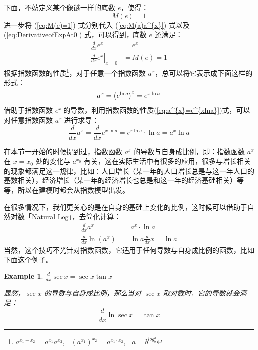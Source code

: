 \documentclass{ctexart}
\numberwithin{equation}{section}
\numberwithin{figure}{section}
\newtheorem{myEx}{Example}[section] %
\begin{document}
下面，不妨定义某个像谜一样的底数 \(e\)，使得：
\begin{equation} \label{eq:M(e)=1}
    M(e) = 1
\end{equation}
进一步将 (\ref{eq:M(e)=1}) 式分别代入 (\ref{eq:M(a)a^{x}}) 式以及 (\ref{eq:DerivativeofExpAt0}) 式，可以得到，底数 \(e\) 还满足：
\begin{equation}
    \begin{aligned}
        \frac{d}{dx}e^{x}                    & = e^{x}    \\
        \left.\frac{d}{dx}e^{x}\right|_{x=0} & = M(e) = 1
    \end{aligned}
\end{equation}
根据指数函数的性质\footnote{\(a^{x_1+x_2} = a^{x_1}a^{x_2}\),\ \ \((a^{x_1})^{x_2} = a^{x_1\cdot x_2}\),\ \ \(a = b^{log_{b}^{a}}\)}，对于任意一个指数函数 \(a^{x}\)，总可以将它表示成下面这样的形式：
\begin{equation}\label{eq:a^{x}=e^{xlna}}
    a^{x} = \left(e^{\ln a}\right)^{x} = e^{x\ln a}
\end{equation}
借助于指数函数 \(e^{x}\) 的导数，利用指数函数的性质(\ref{eq:a^{x}=e^{xlna}})式，可以对任意指数函数 \(a^{x}\) 进行求导：
\begin{equation}
    \frac{d}{dx}a^{x} = \frac{d}{dx} e^{x\ln a} = e^{x\ln a}\cdot \ln a = a^{x}\ln a
\end{equation}

在本节一开始的时候提到过，指数函数 \(a^{x}\) 的导数与自身成比例，即：指数函数 \(a^{x}\) 在 \(x=x_0\) 处的变化与 \(a^{x_0}\) 有关，这在实际生活中有很多的应用，很多与增长相关的现象都满足这一规律，比如：人口增长（某一年的人口增长总是与这一年人口的基数相关），经济增长（某一年的经济增长也总是和这一年的经济基础相关）等等，所以在建模时都会从指数模型出发。

在很多情况下，我们更关心的是在自身的基础上变化的比例，这时候可以借助于自然对数「Natural Log」，去简化计算：
\begin{align*}
    \frac{d}{dx}a^{x}                  & = a^{x}\cdot \ln a          \\
    \frac{d}{dx}\ln \left(a^{x}\right) & =\ln a\frac{d}{dx}x = \ln a
\end{align*}
当然，这个技巧不光针对指数函数，它适用于任何导数与自身成比例的函数，比如下面这个例子。
\begin{myEx}
    \(\frac{d}{dx}\sec x = \sec x \tan x\)

    显然，\(\sec x\) 的导数与自身成比例，那么当对 \(\sec x\) 取对数时，它的导数就会满足：
    \begin{equation*}
        \frac{d}{dx}\ln \sec x = \tan x
    \end{equation*}
\end{myEx}
\end{document}
